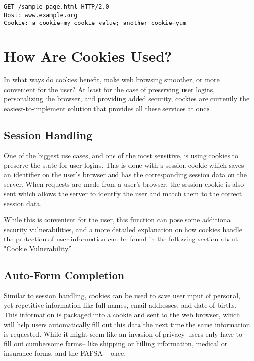 \documentclass[conference,12pt]{IEEEtran}
\begin{document}
\begin{lstlisting}[caption={Client request including cookie}]
GET /sample_page.html HTTP/2.0
Host: www.example.org
Cookie: a_cookie=my_cookie_value; another_cookie=yum
\end{lstlisting}

\section{How Are Cookies Used?}

In what ways do cookies benefit, make web browsing smoother, or more convenient
for the user? At least for the case of preserving user logins, personalizing the
browser, and providing added security, cookies are currently the
easiest-to-implement solution that provides all these services at once.

\subsection{Session Handling}

One of the biggest use cases, and one of the most sensitive, is using cookies to
preserve the state for user logins.  This is done with a session cookie which
saves an identifier on the user’s browser and has the corresponding session data
on the server.  When requests are made from a user’s browser, the session cookie
is also sent which allows the server to identify the user and match them to the
correct session data.

While this is convenient for the user, this function can pose some additional
security vulnerabilities, and a more detailed explanation on how cookies handle
the protection of user information can be found in the following section about
"Cookie Vulnerability.”

\subsection{Auto-Form Completion}

Similar to session handling, cookies can be used to save user input of personal,
yet repetitive information like full names, email addresses, and date of births.
This information is packaged into a cookie and sent to the web browser, which
will help users automatically fill out this data the next time the same
information is requested. While it might seem like an invasion of privacy, users
only have to fill out cumbersome forms-- like shipping or billing information,
medical or insurance forms, and the FAFSA -- once. 
\end{document}
